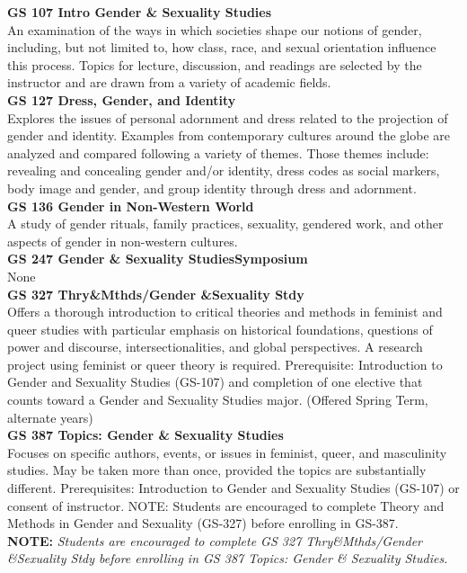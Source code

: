 \documentclass[
  letterpaper,
]{scrbook}
\begin{document}
\textbf{GS 107 Intro Gender \& Sexuality Studies}\\
An examination of the ways in which societies shape our notions of
gender, including, but not limited to, how class, race, and sexual
orientation influence this process. Topics for lecture, discussion, and
readings are selected by the instructor and are drawn from a variety of
academic fields.\\
\textbf{GS 127 Dress, Gender, and Identity}\\
Explores the issues of personal adornment and dress related to the
projection of gender and identity. Examples from contemporary cultures
around the globe are analyzed and compared following a variety of
themes. Those themes include: revealing and concealing gender and/or
identity, dress codes as social markers, body image and gender, and
group identity through dress and adornment.\\
\textbf{GS 136 Gender in Non-Western World}\\
A study of gender rituals, family practices, sexuality, gendered work,
and other aspects of gender in non-western cultures.\\
\textbf{GS 247 Gender \& Sexuality StudiesSymposium}\\
None\\
\textbf{GS 327 Thry\&Mthds/Gender \&Sexuality Stdy}\\
Offers a thorough introduction to critical theories and methods in
feminist and queer studies with particular emphasis on historical
foundations, questions of power and discourse, intersectionalities, and
global perspectives. A research project using feminist or queer theory
is required. Prerequisite: Introduction to Gender and Sexuality Studies
(GS-107) and completion of one elective that counts toward a Gender and
Sexuality Studies major. (Offered Spring Term, alternate years)\\
\textbf{GS 387 Topics: Gender \& Sexuality Studies}\\
Focuses on specific authors, events, or issues in feminist, queer, and
masculinity studies. May be taken more than once, provided the topics
are substantially different. Prerequisites: Introduction to Gender and
Sexuality Studies (GS-107) or consent of instructor. NOTE: Students are
encouraged to complete Theory and Methods in Gender and Sexuality
(GS-327) before enrolling in GS-387.\\
\textbf{NOTE:} \emph{Students are encouraged to complete GS 327
Thry\&Mthds/Gender \&Sexuality Stdy before enrolling in GS 387 Topics:
Gender \& Sexuality Studies. }
\end{document}
